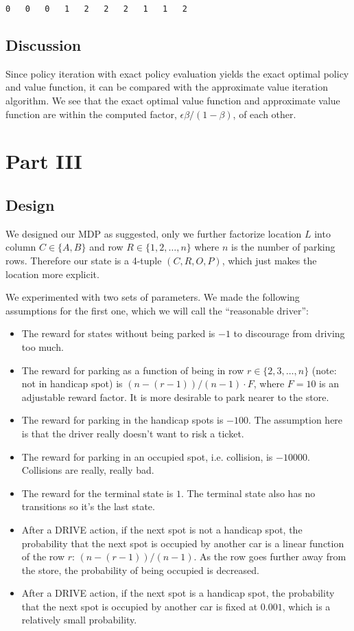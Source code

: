 \documentclass[paper=a4, fontsize=11pt]{scrartcl}
\begin{document}
\begin{verbatim}
0	0	0	1	2	2	2	1	1	2
\end{verbatim}

\subsection{Discussion}

Since policy iteration with exact policy evaluation yields the exact optimal policy and value function, it can be compared with the approximate value iteration algorithm. We see that the exact optimal value function and approximate value function are within the computed factor, $\epsilon \beta / (1 - \beta)$, of each other.

\section{Part III}

\subsection{Design}

We designed our MDP as suggested, only we further factorize location $L$ into column $C \in \{A, B\}$ and row $R \in \{1, 2, \ldots, n\}$ where $n$ is the number of parking rows. Therefore our state is a 4-tuple $(C, R, O, P)$, which just makes the location more explicit.

We experimented with two sets of parameters. We made the following assumptions for the first one, which we will call the ``reasonable driver'':

\begin{itemize}
\item The reward for states without being parked is $-1$ to discourage from driving too much.
\item The reward for parking as a function of being in row $r \in \{2, 3, \ldots, n\}$ (note: not in handicap spot) is $(n-(r-1))/(n-1) \cdot F$, where $F=10$ is an adjustable reward factor. It is more desirable to park nearer to the store.
\item The reward for parking in the handicap spots is $-100$. The assumption here is that the driver really doesn't want to risk a ticket.
\item The reward for parking in an occupied spot, i.e. collision, is $-10000$. Collisions are really, really bad.
\item The reward for the terminal state is $1$. The terminal state also has no transitions so it's the last state.
\item After a DRIVE action, if the next spot is not a handicap spot, the probability that the next spot is occupied by another car is a linear function of the row $r$: $(n-(r-1))/(n-1)$. As the row goes further away from the store, the probability of being occupied is decreased.
\item After a DRIVE action, if the next spot is a handicap spot, the probability that the next spot is occupied by another car is fixed at $0.001$, which is a relatively small probability.
\end{itemize}
\end{document}
